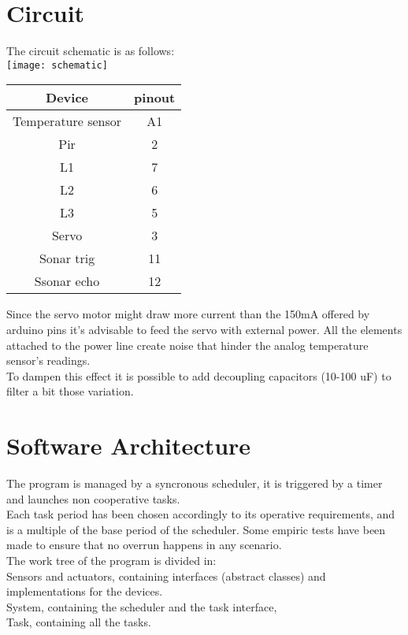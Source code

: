 \section{Circuit}
The circuit schematic is as follows:\\
\texttt{[image: schematic]}
\begin{center}
    \begin{tabular}{|c|c|}
        \hline
        Device             & pinout \\
        \hline
        \hline
        Temperature sensor & A1     \\
        \hline
        Pir                & 2      \\
        \hline
        L1                 & 7      \\
        \hline
        L2                 & 6      \\
        \hline
        L3                 & 5      \\
        \hline
        Servo              & 3      \\
        \hline
        Sonar trig         & 11     \\
        \hline
        Ssonar echo        & 12     \\
        \hline
    \end{tabular}
\end{center}
Since the servo motor might draw more current than the 150mA offered by arduino pins it's advisable to feed the servo with external power.
All the elements attached to the power line create noise that hinder the analog temperature sensor's readings.\\
To dampen this effect it is possible to add decoupling capacitors (10-100 uF) to filter a bit those variation.
\section{Software Architecture}
The program is managed by a syncronous scheduler, it is triggered by a timer and launches non cooperative tasks.\\
Each task period has been chosen accordingly to its operative requirements, and is a multiple of the base period of the scheduler.
Some empiric tests have been made to ensure that no overrun happens in any scenario.\\
The work tree of the program is divided in:\\
Sensors and actuators, containing interfaces (abstract classes) and implementations for the devices.\\
System, containing the scheduler and the task interface,\\
Task, containing all the tasks.
